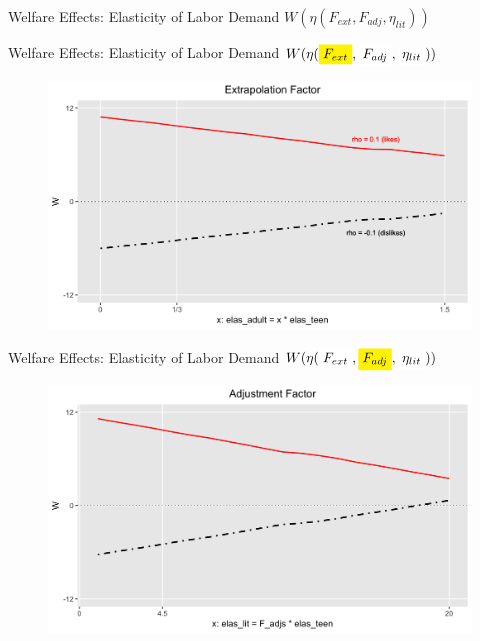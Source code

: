 \documentclass{beamer}
\newcommand{\highlight}[1]{\colorbox{yellow}{$\displaystyle #1$}}
\newcommand{\highlightw}[1]{\colorbox{white}{$\displaystyle #1$}}
\begin{document}
\begin{frame}{Welfare Effects: Elasticity of Labor Demand $W(\eta( F_{ext}, F_{adj},\eta_{lit}))$ }
\end{frame}

\begin{frame}[noframenumbering]{Welfare Effects: Elasticity of Labor Demand $W(\eta(\highlight{F_{ext}}, \highlightw{F_{adj}},\highlightw{\eta_{lit}}))$ }
\begin{figure}[h!]
\centering
\hspace{-1em}
\includegraphics[scale = 0.13]{../Images/sa_extrap}
\end{figure}	
\end{frame}

\begin{frame}[noframenumbering]{Welfare Effects: Elasticity of Labor Demand $W(\eta( \highlightw{F_{ext}}, \highlight{F_{adj}},\highlightw{\eta_{lit}} ))$ }
\begin{figure}[h!]
\centering
\hspace{-1em}
\includegraphics[scale = 0.13]{../Images/sa_f_adj}
\end{figure}	
\end{frame}
\end{document}
